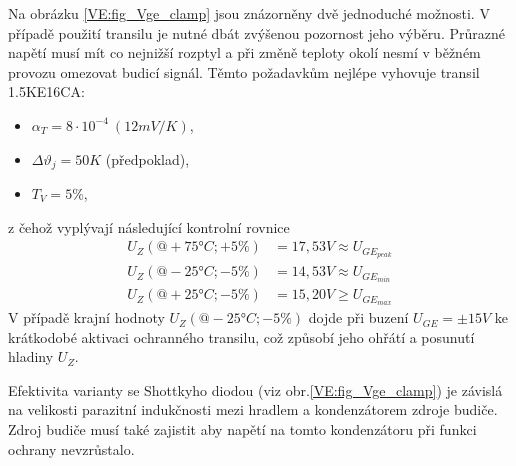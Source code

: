      Na obrázku \ref{VE:fig_Vge_clamp} jsou znázorněny dvě jednoduché možnosti. V případě použití
     transilu je nutné dbát zvýšenou pozornost jeho výběru. Průrazné napětí musí mít co nejnižší
     rozptyl a při změně teploty okolí nesmí v běžném provozu omezovat budicí signál. Těmto
     požadavkům nejlépe vyhovuje transil 1.5KE16CA:
      \begin{itemize}
        \item $\alpha_T = 8\cdot10^{-4}\ (12mV/K)$,
        \item $\Delta\vartheta_j = 50K$ (předpoklad),
        \item $T_V = 5\%$,
      \end{itemize}
     z čehož vyplývají následující kontrolní rovnice
      \begin{align}
        U_Z(@+75°C; +5\%) &= 17,53V\approx U_{GE_{peak}}\\
        U_Z(@-25°C; -5\%) &= 14,53V\approx U_{GE_{min}} \\
        U_Z(@+25°C; -5\%) &= 15,20V\geq U_{GE_{max}}
      \end{align}
     V případě krajní hodnoty $U_Z(@-25°C; -5\%)$ dojde při buzení $U_{GE}=\pm15V$ ke krátkodobé
     aktivaci ochranného transilu, což způsobí jeho ohřátí a posunutí hladiny $U_Z$.

     Efektivita varianty se Shottkyho diodou (viz obr.\ref{VE:fig_Vge_clamp}) je závislá na 
     velikosti parazitní indukčnosti mezi hradlem a kondenzátorem zdroje budiče. Zdroj budiče musí 
     také zajistit aby napětí na tomto kondenzátoru při funkci ochrany nevzrůstalo.    

